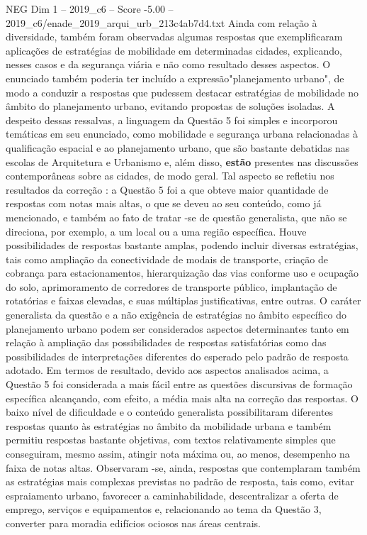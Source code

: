 \begin{textsample}{NEG Dim 1 – 2019\_c6 – Score -5.00 – 2019\_c6/enade\_2019\_arqui\_urb\_213c4ab7d4.txt}
Ainda com relação à diversidade, também foram observadas algumas respostas que exemplificaram aplicações de estratégias de mobilidade em determinadas cidades, explicando, nesses casos e da segurança viária e não como resultado desses aspectos.
O enunciado também poderia ter incluído a expressão"planejamento urbano", de modo a conduzir a respostas que pudessem destacar estratégias de mobilidade no âmbito do planejamento urbano, evitando propostas de soluções isoladas.
A despeito dessas ressalvas, a linguagem da Questão 5 foi simples e incorporou temáticas em seu enunciado, como mobilidade e segurança urbana relacionadas à qualificação espacial e ao planejamento urbano, que são bastante debatidas nas escolas de Arquitetura e Urbanismo e, além disso, \textbf{estão} presentes nas discussões contemporâneas sobre as cidades, de modo geral.
Tal aspecto se refletiu nos resultados da correção : a Questão 5 foi a que obteve maior quantidade de respostas com notas mais altas, o que se deveu ao seu conteúdo, como já mencionado, e também ao fato de tratar -se de questão generalista, que não se direciona, por exemplo, a um local ou a uma região específica.
Houve possibilidades de respostas bastante amplas, podendo incluir diversas estratégias, tais como ampliação da conectividade de modais de transporte, criação de cobrança para estacionamentos, hierarquização das vias conforme uso e ocupação do solo, aprimoramento de corredores de transporte público, implantação de rotatórias e faixas elevadas, e suas múltiplas justificativas, entre outras.
O caráter generalista da questão e a não exigência de estratégias no âmbito específico do planejamento urbano podem ser considerados aspectos determinantes tanto em relação à ampliação das possibilidades de respostas satisfatórias como das possibilidades de interpretações diferentes do esperado pelo padrão de resposta adotado.
Em termos de resultado, devido aos aspectos analisados acima, a Questão 5 foi considerada a mais fácil entre as questões discursivas de formação específica alcançando, com efeito, a média mais alta na correção das respostas.
O baixo nível de dificuldade e o conteúdo generalista possibilitaram diferentes respostas quanto às estratégias no âmbito da mobilidade urbana e também permitiu respostas bastante objetivas, com textos relativamente simples que conseguiram, mesmo assim, atingir nota máxima ou, ao menos, desempenho na faixa de notas altas.
Observaram -se, ainda, respostas que contemplaram também as estratégias mais complexas previstas no padrão de resposta, tais como, evitar espraiamento urbano, favorecer a caminhabilidade, descentralizar a oferta de emprego, serviços e equipamentos e, relacionando ao tema da Questão 3, converter para moradia edifícios ociosos nas áreas centrais.

\end{textsample}
